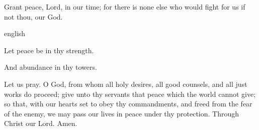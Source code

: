 \begin{enpars}\noindent 
Grant peace, Lord, in our time;
for there is none else
who would fight for us
if not thou, our God.
\end{enpars}

{english}
{\noindent \vv Let peace be in thy strength.

\noindent \rr And abundance in thy towers.

\noindent Let us pray. O God, from whom all holy desires, all good counsels, and all just works do proceed; give unto thy servants that peace which the world cannot give; so that, with our hearts set to obey thy commandments, and freed from the fear of the enemy, we may pass our lives in peace under thy protection. Through Christ our Lord. Amen.}